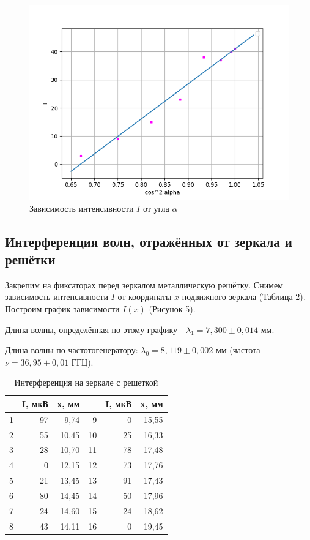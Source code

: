 \documentclass[a4paper,12pt]{article}
\begin{document}
\begin{figure}[h!]
\includegraphics[scale=0.7]{graph1.png}
\centering
\caption{Зависимость интенсивности $I$ от угла $\alpha$}
\end{figure}

\subsection{Интерференция волн, отражённых от зеркала и решётки}

Закрепим на фиксаторах перед зеркалом металлическую решётку. Снимем зависимость интенсивности $I$ от координаты $x$ подвижного зеркала (Таблица 2). Построим график зависимости $I(x)$ (Рисунок 5).

Длина волны, определённая по этому графику - $\lambda_1 = 7,300 \pm 0,014$ мм. \par

Длина волны по частотогенератору: $\lambda_0 = 8,119 \pm 0,002$ мм (частота $\nu = 36,95\pm 0,01$ ГГЦ).

\begin{table}[h!]
\centering
\begin{tabular}{|l|r|r|r|r|r|}
\hline
\textbf{} & \multicolumn{1}{l|}{\textbf{I, мкВ}} & \multicolumn{1}{l|}{\textbf{x, мм}} & \multicolumn{1}{l|}{} & \multicolumn{1}{l|}{\textbf{I, мкВ}} & \multicolumn{1}{l|}{\textbf{x, мм}} \\ \hline
1 & 97 & 9,74 & 9 & 0 & 15,55 \\ \hline
2 & 55 & 10,45 & 10 & 25 & 16,33 \\ \hline
3 & 28 & 10,70 & 11 & 78 & 17,48 \\ \hline
4 & 0 & 12,15 & 12 & 73 & 17,76 \\ \hline
5 & 21 & 13,45 & 13 & 91 & 17,43 \\ \hline
6 & 80 & 14,45 & 14 & 50 & 17,96 \\ \hline
7 & 24 & 14,60 & 15 & 24 & 18,62 \\ \hline
8 & 43 & 14,11 & 16 & 0 & 19,45 \\ \hline
\end{tabular}
\caption{Интерференция на зеркале с решеткой}
\label{tab: 1}
\end{table}
    
\end{document}
